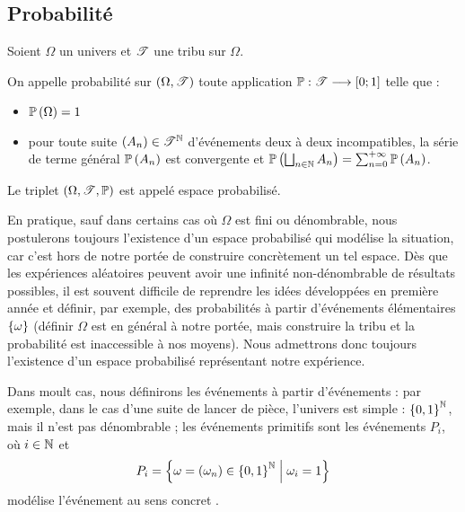 \subsection{Probabilité}

\begin{defi}
Soient \(\Omega\) un univers et \(\mathscr{T}\) une tribu sur \(\Omega\).

On appelle probabilité sur \(\groupe{\Omega}[\fami{T}]\) toute application \(\mathbb{P}:\mathscr{T}\longrightarrow\left[0;1\right]\) telle que :

\begin{itemize}
    \item \(\mathbb{P}\left(\Omega\right)=1\) \\
    \item pour toute suite \(\left(A_n\right)\in\mathscr{T}^{\mathbb{N}}\) d'événements deux à deux incompatibles, la série de terme général \(\mathbb{P}\left(A_n\right)\) est convergente et \(\mathbb{P}\left(\bigsqcup_{n\in\mathbb{N}}A_n\right)=\sum_{n=0}^{+\infty}\mathbb{P}\left(A_n\right)\).
\end{itemize}

Le triplet \(\anneau{\Omega}[\fami{T}][\prem]\) est appelé espace probabilisé.
\end{defi}

En pratique, sauf dans certains cas où \(\Omega\) est fini ou dénombrable, nous postulerons toujours l'existence d'un espace probabilisé qui modélise la situation, car c'est hors de notre portée de construire concrètement un tel espace. Dès que les expériences aléatoires peuvent avoir une infinité non-dénombrable de résultats possibles, il est souvent difficile de reprendre les idées développées en première année et définir, par exemple, des probabilités à partir d'événements élémentaires \(\left\lbrace\omega\right\rbrace\) (définir \(\Omega\) est en général à notre portée, mais construire la tribu et la probabilité est inaccessible à nos moyens). Nous admettrons donc toujours l'existence d'un espace probabilisé représentant notre expérience.

Dans moult cas, nous définirons les événements à partir d'événements  : par exemple, dans le cas d'une suite de lancer de pièce, l'univers est simple : \(\left\lbrace0,1\right\rbrace^{\mathbb{N}}\), mais il n'est pas dénombrable ; les événements primitifs sont les événements \(P_i\), où \(i\in\mathbb{N}\) et \[P_i=\left\lbrace\omega=\left(\omega_n\right)\in\left\lbrace0,1\right\rbrace^{\mathbb{N}}\;\middle|\;\omega_i=1\right\rbrace\] modélise l'événement au sens concret .

